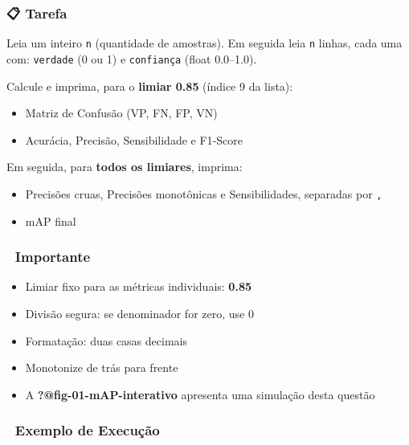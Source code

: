 \documentclass[
  portuguese,
  letterpaper,
  openany,
  oneside,
  12pt,
  a4paper]{book}
\providecommand{\tightlist}{%
  \setlength{\itemsep}{0pt}\setlength{\parskip}{0pt}}
\begin{document}
\subsubsection{📋 Tarefa}\label{tarefa}

Leia um inteiro \texttt{n} (quantidade de amostras). Em seguida leia
\texttt{n} linhas, cada uma com: \texttt{verdade} (0 ou 1) e
\texttt{confiança} (float 0.0--1.0).

Calcule e imprima, para o \textbf{limiar 0.85} (índice 9 da lista):

\begin{itemize}
\tightlist
\item
  Matriz de Confusão (VP, FN, FP, VN)
\item
  Acurácia, Precisão, Sensibilidade e F1‑Score
\end{itemize}

Em seguida, para \textbf{todos os limiares}, imprima:

\begin{itemize}
\tightlist
\item
  Precisões cruas, Precisões monotônicas e Sensibilidades, separadas por
  \texttt{,}
\item
  mAP final
\end{itemize}

\subsubsection{📌 Importante}\label{importante}

\begin{itemize}
\tightlist
\item
  Limiar fixo para as métricas individuais: \textbf{0.85}
\item
  Divisão segura: se denominador for zero, use 0
\item
  Formatação: duas casas decimais
\item
  Monotonize de trás para frente
\item
  A \textbf{?@fig-01-mAP-interativo} apresenta uma simulação desta
  questão
\end{itemize}

\subsubsection{📌 Exemplo de
Execução}\label{exemplo-de-execuuxe7uxe3o-1}
\end{document}

